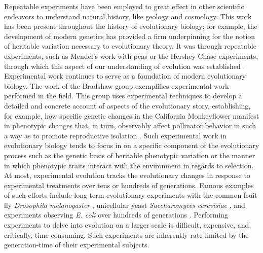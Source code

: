 Repeatable experiments have been employed to great effect in other scientific endeavors to understand natural history, like geology and cosmology.
This work has been present throughout the history of evolutionary biology; for example, the development of modern genetics has provided a firm underpinning for the notion of heritable variation necessary to evolutionary theory.
It was through repeatable experiments, such as Mendel's work with peas or the Hershey-Chase experiments, through which this aspect of our understanding of evolution was established \cite{Griffiths2015IntroductionAnalysis}.
Experimental work continues to serve as a foundation of modern evolutionary biology.
The work of the Bradshaw group exemplifies experimental work performed in the field.
This group uses experimental techniques to develop a detailed and concrete account of aspects of the evolutionary story, establishing, for example, how specific genetic changes in the California Monkeyflower manifest in phenotypic changes that, in turn, observably affect pollinator behavior in such a way as to promote reproductive isolation \cite{Byers2014FloralMimulus}.
Such experimental work in evolutionary biology tends to focus in on a specific component of the evolutionary process such as the genetic basis of heritable phenotypic variation or the manner in which phenotypic traits interact with the environment in regards to selection.
At most, experimental evolution tracks the evolutionary changes in response to experimental treatments over tens or hundreds of generations.
Famous examples of such efforts include long-term evolutionary experiments with the common fruit fly \textit{Drosophila melanogaster} \cite{Rose1984ArtificialMelanogaster}, unicellular yeast \textit{Saccharomyces cerevisiae} \cite{Ratcliff2012ExperimentalMulticellularity.}, and experiments observing \textit{E. coli} over hundreds of generations \cite{ATWOOD1951PeriodicColi.}.
Performing experiments to delve into evolution on a larger scale is difficult, expensive, and, critically, time-consuming.
Such experiments are inherently rate-limited by the generation-time of their experimental subjects.

